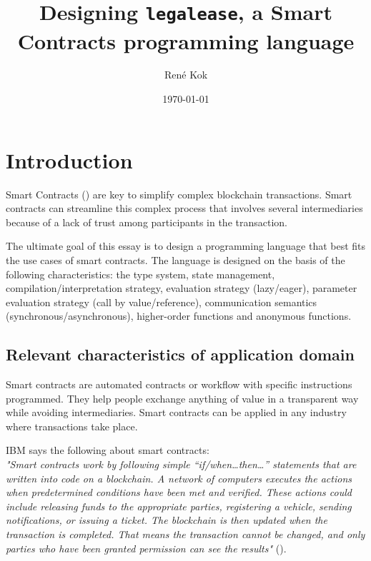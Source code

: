 \documentclass{uva-inf-article}
\title{Designing \texttt{legalease}, a Smart Contracts programming language}
\author{René Kok}
\date{\today}
\begin{document}
\maketitle
\newpage

\section{Introduction}
Smart Contracts (\cite{what-are-smart-contracts}) are key to simplify complex blockchain transactions.
Smart contracts can streamline this complex process that involves several intermediaries because of a 
lack of trust among participants in the transaction.
\vspace{5mm}

The ultimate goal of this essay is to design a programming language that best fits the use cases of smart contracts.
The language is designed on the basis of the following characteristics: 
the type system,
state management,
compilation/interpretation strategy,
evaluation strategy (lazy/eager),
parameter evaluation strategy (call by value/reference),
communication semantics (synchronous/asynchronous),
higher-order functions and anonymous functions.

\subsection{Relevant characteristics of application domain}
Smart contracts are automated contracts or workflow with specific instructions programmed.
They help people exchange anything of value in a transparent way while avoiding intermediaries.
Smart contracts can be applied in any industry where transactions take place.
\vspace{5mm}

IBM says the following about smart contracts:\\
\textit{"Smart contracts work by following simple “if/when…then…” statements that are written 
into code on a blockchain. A network of computers executes the actions  when predetermined conditions have been 
met and verified. These actions could include releasing funds to the appropriate parties, registering a vehicle, 
sending notifications, or issuing a ticket. The blockchain is then updated when the transaction is completed. 
That means the transaction cannot be changed, and only parties who have been granted permission can see the results"}
(\cite{ibm-smart-contracts}).
\vspace{5mm}
\end{document}
